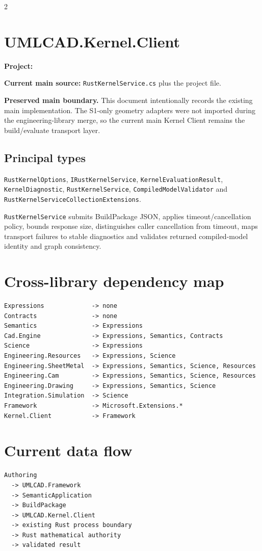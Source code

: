 \documentclass[10pt,a4paper]{article}
\newcommand{\code}[1]{\nolinkurl{#1}}
\newcommand{\filepath}[1]{\path{#1}}
\begin{document}
\begin{multicols}{2}
\section{UMLCAD.Kernel.Client}
\textbf{Project:} \filepath{dotnet/src/UMLCAD.Kernel.Client/}

\textbf{Current main source:} \code{RustKernelService.cs} plus the project file.

\begin{authoritybox}
\small
\textbf{Preserved main boundary.} This document intentionally records the existing main implementation. The S1-only geometry adapters were not imported during the engineering-library merge, so the current main Kernel Client remains the build/evaluate transport layer.
\end{authoritybox}

\subsection{Principal types}
\code{RustKernelOptions}, \code{IRustKernelService}, \code{KernelEvaluationResult}, \code{KernelDiagnostic}, \code{RustKernelService}, \code{CompiledModelValidator} and \code{RustKernelServiceCollectionExtensions}.

\code{RustKernelService} submits BuildPackage JSON, applies timeout/cancellation policy, bounds response size, distinguishes caller cancellation from timeout, maps transport failures to stable diagnostics and validates returned compiled-model identity and graph consistency.

\section{Cross-library dependency map}
\small
\begin{lstlisting}
Expressions             -> none
Contracts               -> none
Semantics               -> Expressions
Cad.Engine              -> Expressions, Semantics, Contracts
Science                 -> Expressions
Engineering.Resources   -> Expressions, Science
Engineering.SheetMetal  -> Expressions, Semantics, Science, Resources
Engineering.Cam         -> Expressions, Semantics, Science, Resources
Engineering.Drawing     -> Expressions, Semantics, Science
Integration.Simulation  -> Science
Framework               -> Microsoft.Extensions.*
Kernel.Client           -> Framework
\end{lstlisting}
\normalsize

\section{Current data flow}
\begin{lstlisting}
Authoring
  -> UMLCAD.Framework
  -> SemanticApplication
  -> BuildPackage
  -> UMLCAD.Kernel.Client
  -> existing Rust process boundary
  -> Rust mathematical authority
  -> validated result


\end{lstlisting}
\end{multicols}
\end{document}
